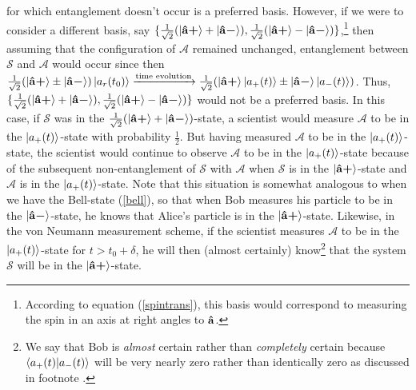     for which entanglement doesn't occur is a preferred basis. However, if we were to consider a different basis, say $\{\frac{1}{\sqrt{2}}(\ket{{\vb{\hat{{a}}}\bm{+}}}+\ket{{\vb{\hat{{a}}}\bm{-}}}), \frac{1}{\sqrt{2}}(\ket{{\vb{\hat{{a}}}\bm{+}}}-\ket{{\vb{\hat{{a}}}\bm{-}}})\}$,\footnote{According to equation (\ref{spintrans}), this basis would correspond to measuring the spin in an axis at right angles to 
    $\vb{\hat{{a}}}$.} then assuming that the configuration of $\mathcal{A}$ remained unchanged, entanglement between $\mathcal{S}$ and $\mathcal{A}$ would occur since then 
    $\frac{1}{\sqrt{2}}(\ket{{\vb{\hat{{a}}}\bm{+}}}\pm\ket{{\vb{\hat{{a}}}\bm{-}}})\ket{a_r(t_0)}\xrightarrow{\text{time evolution}}\frac{1}{\sqrt{2}}(\ket{{\vb{\hat{{a}}}\bm{+}}}\ket{a_+(t)}\pm\ket{{\vb{\hat{{a}}}\bm{-}}}\ket{a_-(t)})$. Thus, $\{\frac{1}{\sqrt{2}}(\ket{{\vb{\hat{{a}}}\bm{+}}}+\ket{{\vb{\hat{{a}}}\bm{-}}}), \frac{1}{\sqrt{2}}(\ket{{\vb{\hat{{a}}}\bm{+}}}-\ket{{\vb{\hat{{a}}}\bm{-}}})\}$ would not be a preferred basis. In this case, if  $\mathcal{S}$ was in the $\frac{1}{\sqrt{2}}(\ket{{\vb{\hat{{a}}}\bm{+}}}+\ket{{\vb{\hat{{a}}}\bm{-}}})$-state, a scientist would measure $\mathcal{A}$ to be in the $\ket{a_+(t)}$-state with probability $\frac{1}{2}$. But having measured $\mathcal{A}$ to be in the $\ket{a_+(t)}$-state, the scientist would continue to observe $\mathcal{A}$ to be in the $\ket{a_+(t)}$-state because of the subsequent non-entanglement of $\mathcal{S}$ with $\mathcal{A}$ when $\mathcal{S}$ is in the   $\ket{{\vb{\hat{{a}}}\bm{+}}}$-state and $\mathcal{A}$ is in the $\ket{a_+(t)}$-state. Note that this situation is somewhat analogous to when we have the Bell-state (\ref{bell}), so that when Bob measures his particle to be in the $\ket{{\vb{\hat{{a}}}\bm{-}}}$-state, he knows that Alice's particle is in the $\ket{{\vb{\hat{{a}}}\bm{+}}}$-state. Likewise, in the von Neumann measurement scheme, if the scientist measures $\mathcal{A}$ to be in the $\ket{a_+(t)}$-state for $t>t_0+\delta$, he will then (almost certainly) know\footnote{We say that Bob is \emph{almost} certain rather than \emph{completely} certain because $\ip{a_+(t)}{a_-(t)}$ will be very nearly zero rather than identically zero as discussed in footnote .} that the system $\mathcal{S}$ will be in the $\ket{{\vb{\hat{{a}}}\bm{+}}}$-state.
    
